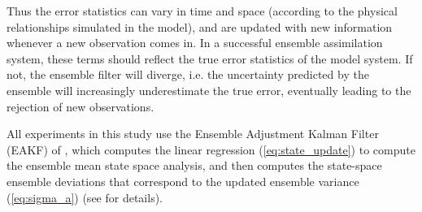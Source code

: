 Thus the error statistics can vary in time and space (according to the physical relationships simulated in the model), and are updated with new information whenever a new observation comes in.  
In a successful ensemble assimilation system, these terms should reflect the true error statistics of the model system.
If not, the ensemble filter will diverge, i.e. the uncertainty predicted by the ensemble will increasingly underestimate the true error, eventually leading to the rejection of new observations.

All experiments in this study use the Ensemble Adjustment Kalman Filter (EAKF) of \citet{anderson2001}, which computes the linear regression (\ref{eq:state_update}) to compute the ensemble mean state space analysis, and then computes the state-space ensemble deviations that correspond to the updated ensemble variance (\ref{eq:sigma_a}) (see \citet{Anderson2003} for details). 
